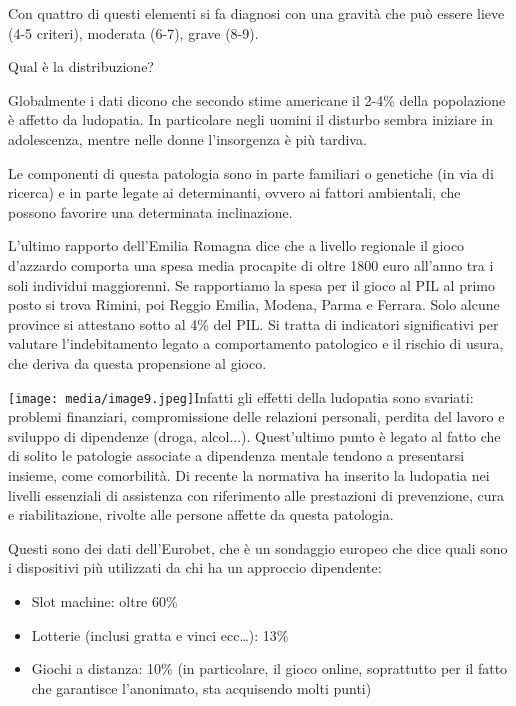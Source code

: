 \documentclass[]{article}
\begin{document}
Con quattro di questi elementi si fa diagnosi con una gravità che può
essere lieve (4-5 criteri), moderata (6-7), grave (8-9).

Qual è la distribuzione?

Globalmente i dati dicono che secondo stime americane il 2-4\% della
popolazione è affetto da ludopatia. In particolare negli uomini il
disturbo sembra iniziare in adolescenza, mentre nelle donne l'insorgenza
è più tardiva.

Le componenti di questa patologia sono in parte familiari o genetiche
(in via di ricerca) e in parte legate ai determinanti, ovvero ai fattori
ambientali, che possono favorire una determinata inclinazione.

L'ultimo rapporto dell'Emilia Romagna dice che a livello regionale il
gioco d'azzardo comporta una spesa media procapite di oltre 1800 euro
all'anno tra i soli individui maggiorenni. Se rapportiamo la spesa per
il gioco al PIL al primo posto si trova Rimini, poi Reggio Emilia,
Modena, Parma e Ferrara. Solo alcune province si attestano sotto al 4\%
del PIL. Si tratta di indicatori significativi per valutare
l'indebitamento legato a comportamento patologico e il rischio di usura,
che deriva da questa propensione al gioco.

\texttt{[image: media/image9.jpeg]}Infatti gli effetti della ludopatia
sono svariati: problemi finanziari, compromissione delle relazioni
personali, perdita del lavoro e sviluppo di dipendenze (droga,
alcol...). Quest'ultimo punto è legato al fatto che di solito le
patologie associate a dipendenza mentale tendono a presentarsi insieme,
come comorbilità. Di recente la normativa ha inserito la ludopatia nei
livelli essenziali di assistenza con riferimento alle prestazioni di
prevenzione, cura e riabilitazione, rivolte alle persone affette da
questa patologia.

Questi sono dei dati dell'Eurobet, che è un sondaggio europeo che dice
quali sono i dispositivi più utilizzati da chi ha un approccio
dipendente:

\begin{itemize}
\item
  Slot machine: oltre 60\%
\item
  Lotterie (inclusi gratta e vinci ecc\ldots{}): 13\%
\item
  Giochi a distanza: 10\% (in particolare, il gioco online, soprattutto
  per il fatto che garantisce l'anonimato, sta acquisendo molti punti)
\end{itemize}
\end{document}
